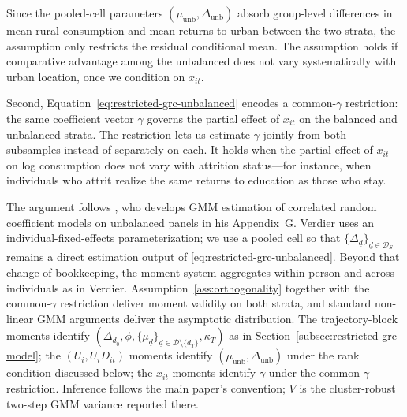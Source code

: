 \documentclass[12pt]{article}
\begin{document}
Since the pooled-cell parameters $(\mu_{\mathrm{unb}},\Delta_{\mathrm{unb}})$ absorb group-level differences in mean rural consumption and mean returns to urban between the two strata, the assumption only restricts the residual conditional mean.
The assumption holds if comparative advantage among the unbalanced does not vary systematically with urban location, once we condition on $x_{it}$.

Second, Equation~\eqref{eq:restricted-grc-unbalanced} encodes a common-$\gamma$ restriction: the same coefficient vector $\gamma$ governs the partial effect of $x_{it}$ on the balanced and unbalanced strata.
The restriction lets us estimate $\gamma$ jointly from both subsamples instead of separately on each.
It holds when the partial effect of $x_{it}$ on log consumption does not vary with attrition status---for instance, when individuals who attrit realize the same returns to education as those who stay.

The argument follows \citet{verdierAverageTreatmentEffects2020a}, who develops GMM estimation of correlated random coefficient models on unbalanced panels in his Appendix~G.
Verdier uses an individual-fixed-effects parameterization; we use a pooled cell so that $\{\Delta_{\underline d}\}_{\underline d \in \mathcal D_S}$ remains a direct estimation output of \eqref{eq:restricted-grc-unbalanced}.
Beyond that change of bookkeeping, the moment system aggregates within person and across individuals as in Verdier.
Assumption~\ref{ass:orthogonality} together with the common-$\gamma$ restriction deliver moment validity on both strata, and standard non-linear GMM arguments \citep{hansen1982gmm,neweyMcFadden1994} deliver the asymptotic distribution.
The trajectory-block moments identify $(\Delta_{\underline d_0}, \phi, \{\mu_{\underline d}\}_{\underline d \in \mathcal D \setminus \{d_T\}}, \kappa_T)$ as in Section~\ref{subsec:restricted-grc-model}; the $(U_i, U_iD_{it})$ moments identify $(\mu_{\mathrm{unb}}, \Delta_{\mathrm{unb}})$ under the rank condition discussed below; the $x_{it}$ moments identify $\gamma$ under the common-$\gamma$ restriction.
Inference follows the main paper's convention; $V$ is the cluster-robust two-step GMM variance reported there.
\end{document}
